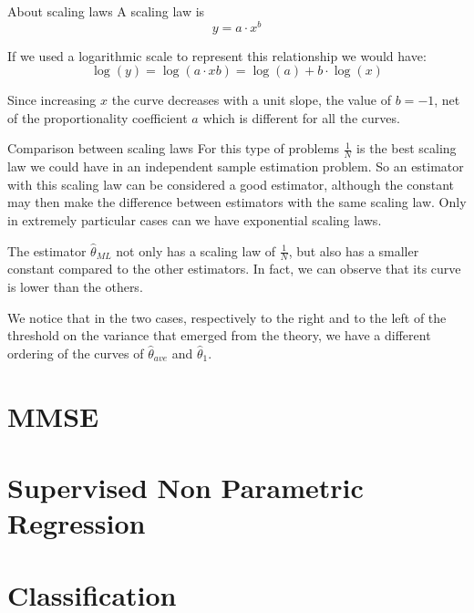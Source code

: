 \begin{note}{About scaling laws}
A scaling law is 
$$
y=a\cdot x^b
$$

If we used a logarithmic scale to represent this relationship we would have:
$$
\log(y)=\log(a\cdot xb)=\log(a)+b\cdot\log(x)
$$

Since increasing $x$ the curve decreases with a unit slope, the value of $b=-1$, net of the proportionality coefficient $a$ which is different for all the curves.
\end{note}
\begin{note}{Comparison between scaling laws}
For this type of problems $\frac 1N$ is the best scaling law we could have in an independent sample estimation problem. So an estimator with this scaling law can be considered a good estimator, although the constant may then make the difference between estimators with the same scaling law.  
Only in extremely particular cases can we have exponential scaling laws.
\end{note}

The estimator $\hat\theta_{ML}$ not only has a scaling law of $\frac 1N$, but also has a smaller constant compared to the other estimators. In fact, we can observe that its curve is lower than the others.

We notice that in the two cases, respectively to the right and to the left of the threshold on the variance that emerged from the theory, we have a different ordering of the curves of $\hat\theta_{ave}$ and $\hat \theta_1$.


\section{MMSE}
\section{Supervised Non Parametric Regression}
\section{Classification}
